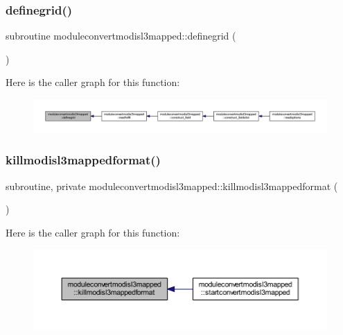 \subsubsection{\texorpdfstring{definegrid()}{definegrid()}}
{\footnotesize\ttfamily subroutine moduleconvertmodisl3mapped\+::definegrid (\begin{DoxyParamCaption}{ }\end{DoxyParamCaption})\hspace{0.3cm}{\ttfamily [private]}}

Here is the caller graph for this function\+:\nopagebreak
\begin{figure}[H]
\begin{center}
\leavevmode
\includegraphics[width=350pt]{namespacemoduleconvertmodisl3mapped_a82cd68f8503b3a5bf96e529ac4715405_icgraph}
\end{center}
\end{figure}
\mbox{\label{namespacemoduleconvertmodisl3mapped_a92c7eb5c01d20a3540cef8d0d437bb08}} 
\subsubsection{\texorpdfstring{killmodisl3mappedformat()}{killmodisl3mappedformat()}}
{\footnotesize\ttfamily subroutine, private moduleconvertmodisl3mapped\+::killmodisl3mappedformat (\begin{DoxyParamCaption}{ }\end{DoxyParamCaption})\hspace{0.3cm}{\ttfamily [private]}}

Here is the caller graph for this function\+:\nopagebreak
\begin{figure}[H]
\begin{center}
\leavevmode
\includegraphics[width=350pt]{namespacemoduleconvertmodisl3mapped_a92c7eb5c01d20a3540cef8d0d437bb08_icgraph}
\end{center}
\end{figure}
\mbox{\label{namespacemoduleconvertmodisl3mapped_ae7ff1f4d8258c08682ea6db04a074c74}} 
